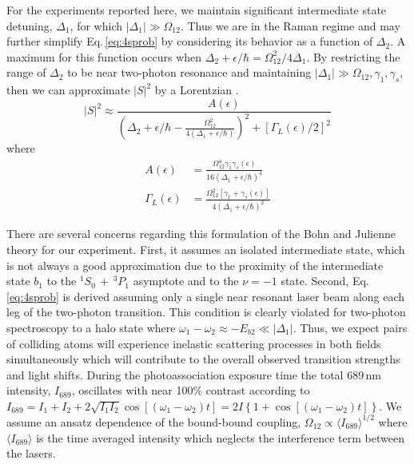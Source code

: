 For the experiments reported here, we maintain significant intermediate state detuning, $\Delta_1$, for which $|\Delta_1| \gg \Omega_{12}$.
Thus we are in the Raman regime and may further simplify Eq.\,\ref{eq:4sprob} by considering its behavior as a function of $\Delta_2$.
A maximum for this function occurs when $\Delta_2 + \epsilon/\hbar = \Omega_{12}^2/4 \Delta_1$.
By restricting the range of $\Delta_2$ to be near two-photon resonance and maintaining $|\Delta_1| \gg \Omega_{12}, \gamma_1, \gamma_s$, then we can approximate $\vert  S \vert^2$ by a Lorentzian \cite{Pachomov2017, Pachomow2017a}.
\begin{equation}
 \vert S\vert^2 \approx \frac{A(\epsilon)}{\left( \Delta_2+\epsilon/\hbar-\frac{\Omega_{12}^{2}} {4(\Delta_1+\epsilon/\hbar)}\right)^2+\left[ {\Gamma_L(\epsilon)}/{2}\right]^2}
\end{equation}
where 
\begingroup
\addtolength{\jot}{1em}
\begin{align}
  A(\epsilon) &= \frac{\Omega_{12}^{4}\gamma_1 \gamma_s(\epsilon)}{16(\Delta_1+\epsilon/\hbar)^4} \\
  \Gamma_L(\epsilon) &= \frac{\Omega_{12}^{2}[\gamma_1 +\gamma_s(\epsilon)]}{4(\Delta_1+\epsilon/\hbar)^2}
\end{align}
\endgroup

There are several concerns regarding this formulation of the Bohn and Julienne theory for our experiment.
First, it assumes an isolated intermediate state, which is not always a good approximation due to the proximity of the intermediate state $b_1$ to the $^1S_0\,+\,^3P_1$ asymptote and to the $\nu = -1$ state.
Second, Eq.\,\ref{eq:4sprob} is derived assuming only a single near resonant laser beam along each leg of the two-photon transition.
This condition is clearly violated for two-photon spectroscopy to a halo state where $\omega_1 - \omega_2 \approx -E_{b2} \ll |\Delta_1|$.
Thus, we expect pairs of colliding atoms will experience inelastic scattering processes in both fields simultaneously which will contribute to the overall observed transition strengths and light shifts.
During the photoassociation exposure time the total 689\,nm intensity, $I_{\text{689}}$, oscillates with near 100\% contrast according to $I_{\text{689}}=I_1+I_2+2\sqrt{I_1I_2}\cos \left[(\omega_1-\omega_2)t \right]=2I\left\{1+\cos \left[(\omega_1-\omega_2)t \right]\right\}$.
We assume an ansatz dependence of the bound-bound coupling, $\Omega_{12} \propto \langle I_{689} \rangle^{1/2}$ where $\langle I_{689} \rangle$ is the time averaged intensity which neglects the interference term between the lasers.

